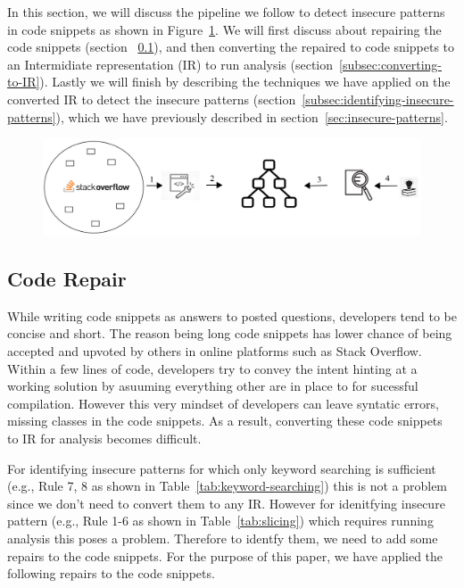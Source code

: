 
In this section, we will discuss the pipeline we follow to detect insecure patterns in code snippets as shown in Figure~\ref{fig:pipeline}. We will first discuss about repairing the code snippets (section ~\ref{subsec:code-repair}), and then converting the repaired to code snippets to an Intermidiate representation (IR) to run analysis (section~\ref{subsec:converting-to-IR}). Lastly we will finish by describing the techniques we have applied on the converted IR to detect the insecure patterns (section~\ref{subsec:identifying-insecure-patterns}), which we have previously described in section~\ref{sec:insecure-patterns}.     
\begin{figure}[t]
  \centering
  \includegraphics*[width=\linewidth]{Figures/overall-process.png}
  \caption{}
  \label{fig:pipeline}
\end{figure}


\subsection{Code Repair}
\label{subsec:code-repair}
While writing code snippets as answers to posted questions, developers tend to be concise and short. The reason being long code snippets has lower chance of being accepted and upvoted by others in online platforms such as Stack Overflow. Within a few lines of code, developers try to convey the intent hinting at a working solution by asuuming everything other are in place to for sucessful compilation. However this very mindset of developers can leave syntatic errors, missing classes in the code snippets. As a result, converting these code snippets to IR for analysis becomes difficult.

For identifying insecure patterns for which only keyword searching is sufficient (e.g., Rule 7, 8 as shown in Table~\ref{tab:keyword-searching}) this is not a problem since we don't need to convert them to any IR. However for idenitfying insecure pattern (e.g., Rule 1-6 as shown in Table~\ref{tab:slicing}) which requires running analysis this poses a problem. Therefore to identfy them, we need to add some repairs to the code snippets. For the purpose of this paper, we have applied the following repairs to the code snippets.

